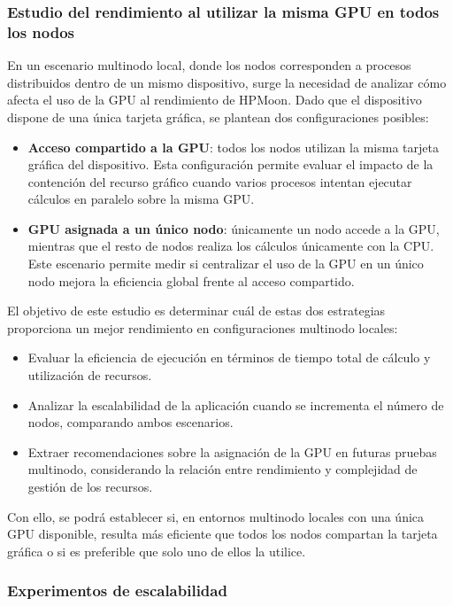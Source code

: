 \subsubsection{Estudio del rendimiento al utilizar la misma GPU en todos los nodos}

En un escenario multinodo local, donde los nodos corresponden a procesos distribuidos dentro de un mismo dispositivo, surge la necesidad de analizar cómo afecta el uso de la GPU al rendimiento de HPMoon. Dado que el dispositivo dispone de una única tarjeta gráfica, se plantean dos configuraciones posibles:

\begin{itemize}
    \item \textbf{Acceso compartido a la GPU}: todos los nodos utilizan la misma tarjeta gráfica del dispositivo. Esta configuración permite evaluar el impacto de la contención del recurso gráfico cuando varios procesos intentan ejecutar cálculos en paralelo sobre la misma GPU.
    \item \textbf{GPU asignada a un único nodo}: únicamente un nodo accede a la GPU, mientras que el resto de nodos realiza los cálculos únicamente con la CPU. Este escenario permite medir si centralizar el uso de la GPU en un único nodo mejora la eficiencia global frente al acceso compartido.
\end{itemize}

El objetivo de este estudio es determinar cuál de estas dos estrategias proporciona un mejor rendimiento en configuraciones multinodo locales:

\begin{itemize}
    \item Evaluar la eficiencia de ejecución en términos de tiempo total de cálculo y utilización de recursos.
    \item Analizar la escalabilidad de la aplicación cuando se incrementa el número de nodos, comparando ambos escenarios.
    \item Extraer recomendaciones sobre la asignación de la GPU en futuras pruebas multinodo, considerando la relación entre rendimiento y complejidad de gestión de los recursos.
\end{itemize}

Con ello, se podrá establecer si, en entornos multinodo locales con una única GPU disponible, resulta más eficiente que todos los nodos compartan la tarjeta gráfica o si es preferible que solo uno de ellos la utilice.

\subsubsection{Experimentos de escalabilidad}

